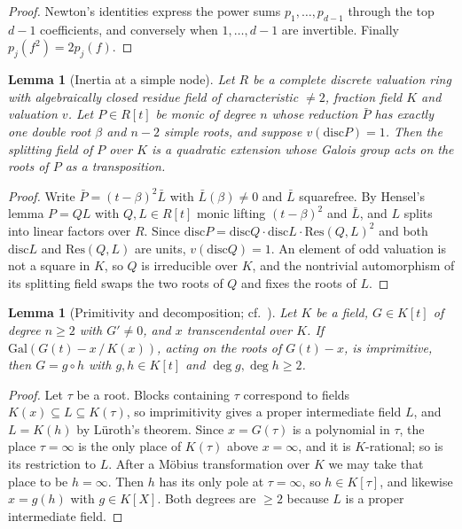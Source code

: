 \documentclass[11pt,a4paper]{article}
\newtheorem{lemma}[theorem]{Lemma}
\theoremstyle{definition}
\theoremstyle{remark}
\newcommand{\Gal}{\mathrm{Gal}}
\newcommand{\disc}{\mathrm{disc}}
\begin{document}
\begin{proof}
Newton's identities express the power sums $p_1,\dots,p_{d-1}$ through the top $d-1$
coefficients, and conversely when $1,\dots,d-1$ are invertible. Finally $p_j(f^2)=2p_j(f)$.
\end{proof}

\begin{lemma}[Inertia at a simple node]\label{lem:node}
Let $R$ be a complete discrete valuation ring with algebraically closed residue
field of characteristic $\ne2$, fraction field $K$ and valuation $v$.
Let $P\in R[t]$ be monic of degree $n$ whose reduction $\bar P$ has exactly
one double root $\beta$ and $n-2$ simple roots, and suppose $v(\disc P)=1$.
Then the splitting field of $P$ over $K$ is a quadratic extension whose
Galois group acts on the roots of $P$ as a transposition.
\end{lemma}

\begin{proof}
Write $\bar P=(t-\beta)^2\bar L$ with $\bar L(\beta)\neq0$ and $\bar L$ squarefree.
By Hensel's lemma $P=QL$ with $Q,L\in R[t]$ monic lifting $(t-\beta)^2$ and $\bar L$,
and $L$ splits into linear factors over $R$.
Since $\disc P=\disc Q\cdot\disc L\cdot\mathrm{Res}(Q,L)^2$ and both
$\disc L$ and $\mathrm{Res}(Q,L)$ are units, $v(\disc Q)=1$.
An element of odd valuation is not a square in $K$, so $Q$ is irreducible over
$K$, and the nontrivial automorphism of its splitting field swaps the two roots of $Q$
and fixes the roots of $L$.
\end{proof}

\begin{lemma}[Primitivity and decomposition; cf.\ \cite{Turnwald1995,Muller1995}]\label{lem:luroth}
Let $K$ be a field, $G\in K[t]$ of degree $n\ge2$ with $G'\neq0$, and $x$
transcendental over $K$. If $\Gal(G(t)-x\,/\,K(x))$, acting on the roots of $G(t)-x$,
is imprimitive, then $G=g\circ h$ with $g,h\in K[t]$ and $\deg g,\deg h\ge2$.
\end{lemma}

\begin{proof}
Let $\tau$ be a root. Blocks containing $\tau$ correspond to fields $K(x)\subseteq L\subseteq K(\tau)$,
so imprimitivity gives a proper intermediate field $L$, and $L=K(h)$ by L\"uroth's theorem.
Since $x=G(\tau)$ is a polynomial in $\tau$, the place $\tau=\infty$ is the only
place of $K(\tau)$ above $x=\infty$, and it is $K$-rational; so is its restriction to $L$.
After a M\"obius transformation over $K$ we may take that place to be $h=\infty$.
Then $h$ has its only pole at $\tau=\infty$, so $h\in K[\tau]$, and likewise $x=g(h)$ with
$g\in K[X]$. Both degrees are $\ge2$ because $L$ is a proper intermediate field.
\end{proof}
\end{document}
